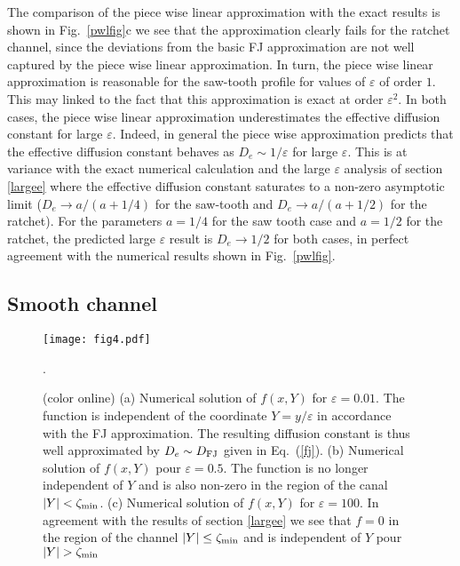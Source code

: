 \documentclass[pre,showpacs,preprintnumbers,amsmath,amssymb,superscriptaddress]{revtex4-1}
\begin{document}
{{The comparison of the piece wise linear approximation with the exact results is shown in Fig.~\ref{pwlfig}c we see that  the approximation clearly fails for the ratchet channel, since the deviations from the basic FJ approximation are not well captured by the piece wise linear approximation. In turn, the  piece wise linear approximation is reasonable for the saw-tooth profile for values of $\varepsilon$ of order $1$. This may linked to the fact that this approximation is exact at order $\varepsilon^2$. In both cases, the piece wise linear approximation underestimates the effective diffusion constant for large $\varepsilon$. Indeed, in general the piece wise approximation predicts that the effective diffusion constant behaves as $D_e \sim 1/\varepsilon$ for large $\varepsilon$. This is at variance with the exact numerical calculation and the large $\varepsilon$ analysis of section \ref{largee} where the effective diffusion constant saturates to a non-zero asymptotic limit ($D_e \to a/(a+1/4)$ for the saw-tooth and $D_e\to a/(a+1/2)$ for the ratchet). For the parameters $a=1/4$ for the saw tooth case and $a=1/2$ for the ratchet, the predicted large $\varepsilon$ result is $D_e\to 1/2$ for both cases, in perfect agreement with the numerical results shown in Fig.~\ref{pwlfig}.



\subsection{Smooth channel}

\begin{figure}
\begin{center}
  \texttt{[image: fig4.pdf]}
  \caption{(color online) (a) Numerical solution of $f(x,Y)$ for $\varepsilon=0.01$. The function is independent of the coordinate $Y=y/\varepsilon$ in accordance with the FJ approximation. The resulting diffusion constant is thus well approximated by $D_e \sim D_{\rm FJ}$ given in Eq.~(\ref{fj}). (b) Numerical solution of $f(x,Y)$ pour $\varepsilon=0.5$. The function is no longer independent of $Y$ and is also non-zero in the region of the canal $|Y|<\zeta_{\rm min}$. (c) Numerical solution of $f(x,Y)$ for $\varepsilon=100$. In agreement with the results of section \ref{largee} we see that $f=0$ in the region of the channel $|Y|\le \zeta_{\rm min}$ and is independent of $Y$ pour $|Y|>\zeta_{\rm min}$}.\label{sinefigs}
\end{center}
\end{figure}

}}
\end{document}
